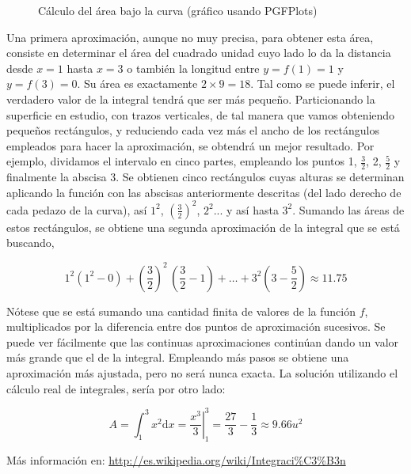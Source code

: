 \documentclass[12pt,letterpaper]{article}
\begin{document}
\begin{figure}[h] 
	\centering


	\caption{Cálculo del área bajo la curva (gráfico usando PGFPlots)}
	\label{fig:tres}
\end{figure}

Una primera aproximación, aunque no muy precisa, para obtener esta área, consiste en determinar el área del cuadrado unidad cuyo lado lo da la distancia desde $x=1$ hasta $x=3$ o también la longitud entre $y=f(1)=1$ y $y=f(3)=0$. Su área es exactamente $2 \times 9 = 18$. Tal como se puede inferir, el verdadero valor de la integral tendrá que ser más pequeño. Particionando la superficie en estudio, con trazos verticales, de tal manera que vamos obteniendo pequeños rectángulos, y reduciendo cada vez más el ancho de los rectángulos empleados para hacer la aproximación, se obtendrá un mejor resultado. Por ejemplo, dividamos el intervalo en cinco partes, empleando los puntos 1, $\frac{3}{2}$, 2, $\frac{5}{2}$ y finalmente la abscisa 3. Se obtienen cinco rectángulos cuyas alturas se determinan aplicando la función con las abscisas anteriormente descritas (del lado derecho de cada pedazo de la curva), así $1^2$, $(\frac{3}{2})^2$, $2^2$... y así hasta $3^2$. Sumando las áreas de estos rectángulos, se obtiene una segunda aproximación de la integral que se está buscando,

\[
 1^2(1^2 - 0)+ \left(\frac{3}{2}\right)^2\,\left(\frac{3}{2}- 1\right)+ \dots + 3^2\left(3-\frac{5}{2}\right) \approx 11.75
\]

Nótese que se está sumando una cantidad finita de valores de la función $f$, multiplicados por la diferencia entre dos puntos de aproximación sucesivos. Se puede ver fácilmente que las continuas aproximaciones continúan dando un valor más grande que el de la integral. Empleando más pasos se obtiene una aproximación más ajustada, pero no será nunca exacta. La solución utilizando el cálculo real de integrales, sería por otro lado:

\begin{displaymath}
	A = \int_{1}^{3} x^2 \mathrm{d}x = \left.\frac{x^3}{3}\right |_1^3 = \frac{27}{3} - \frac{1}{3} \approx 9.66 u^2
\end{displaymath}



Más información en: \url{http://es.wikipedia.org/wiki/Integraci\%C3\%B3n}
\end{document}
